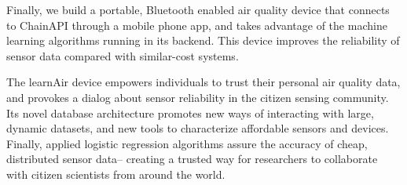 Finally, we build a portable, Bluetooth enabled air quality device that connects to ChainAPI through a mobile phone app, and takes advantage of the machine learning algorithms running in its backend.  This device improves the reliability of sensor data compared with similar-cost systems. 

The learnAir device empowers individuals to trust their personal air quality data, and provokes a dialog about sensor reliability in the citizen sensing community.  Its novel database architecture promotes new ways of interacting with large, dynamic datasets,  and new tools to characterize affordable sensors and devices.  Finally, applied logistic regression algorithms assure the accuracy of cheap, distributed sensor data-- creating a trusted way for researchers to collaborate with citizen scientists from around the world.